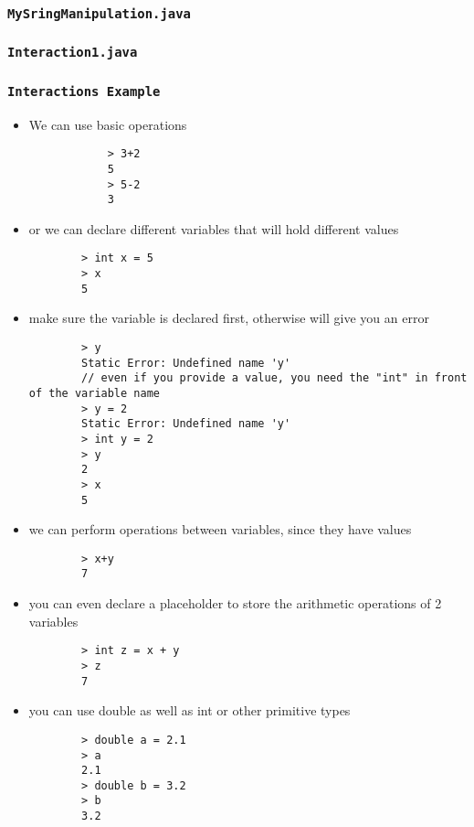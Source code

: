 	\subsubsection {\texttt{MySringManipulation.java}}
	
	\newpage
	
	\subsubsection {\texttt{Interaction1.java}}
	
	\newpage
	
	\subsubsection {\texttt{Interactions Example}}
	\begin{itemize}
		\item We can use basic operations
		\begin{verbatim}
			> 3+2
			5
			> 5-2
			3
		\end{verbatim}
		\item or we can declare different variables that will hold different values
		\begin{verbatim}
		> int x = 5
		> x
		5
		\end{verbatim}
		\item make sure the variable is declared first, otherwise will give you an error
		\begin{verbatim}
		> y
		Static Error: Undefined name 'y'
		// even if you provide a value, you need the "int" in front of the variable name
		> y = 2
		Static Error: Undefined name 'y'
		> int y = 2
		> y
		2
		> x
		5
		\end{verbatim}
		\item we can perform operations between variables, since they have values
		\begin{verbatim}
		> x+y
		7
		\end{verbatim}
		\item you can even declare a placeholder to store the arithmetic operations of 2 variables
		\begin{verbatim}
		> int z = x + y
		> z
		7
		\end{verbatim}
		\item you can use double as well as int or other primitive types
		\begin{verbatim}
		> double a = 2.1
		> a
		2.1
		> double b = 3.2
		> b
		3.2
		\end{verbatim}

\end{itemize}
